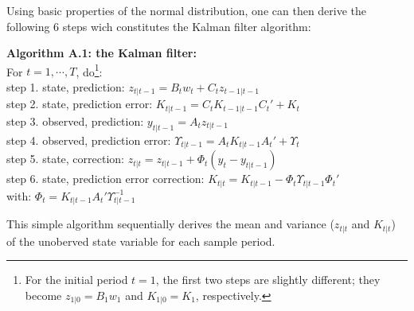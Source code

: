 Using basic properties of the normal distribution, one can then derive the following 6 steps wich constitutes the Kalman filter algorithm:

\textbf{Algorithm A.1: the Kalman filter:} \vspace{3mm} \\
For $t=1,\cdots,T$, do\footnote{For the initial period $t=1$, the first two steps are slightly different; they become $z_{1|0}=B_1 w_1$ and $K_{1|0}=K_1$, respectively.}: \\
\hspace*{4mm} step 1. state, prediction: \hspace{35mm} $z_{t|t-1}=B_t w_t+C_t z_{t-1|t-1}$ \vspace{0.5mm} \\
\hspace*{4mm} step 2. state, prediction error: \hspace{26mm} $K_{t|t-1}=C_t K_{t-1|t-1} C_t'+K_t$ \vspace{0.5mm} \\
\hspace*{4mm} step 3. observed, prediction: \hspace{29mm} $y_{t|t-1}=A_t z_{t|t-1}$ \vspace{0.5mm} \\
\hspace*{4mm} step 4. observed, prediction error: \hspace{19.5mm} $\Upsilon_{t|t-1}=A_t K_{t|t-1} A_t'+\Upsilon_{t}$ \vspace{0.5mm} \\
\hspace*{4mm} step 5. state, correction: \hspace{36mm} $z_{t|t}=z_{t|t-1}+\Phi_t (y_t-y_{t|t-1})$ \vspace{0.5mm} \\
\hspace*{4mm} step 6. state, prediction error correction: \hspace{8mm} $K_{t|t}=K_{t|t-1}-\Phi_t \Upsilon_{t|t-1} \Phi_t'$ \vspace{0.5mm} \\
\hspace*{4mm} with: $\Phi_t=K_{t|t-1} A_t' \Upsilon_{t|t-1}^{-1}$ \vspace{3mm}

This simple algorithm sequentially derives the mean and variance ($z_{t|t}$ and $K_{t|t}$) of the unoberved state variable for each sample period.


